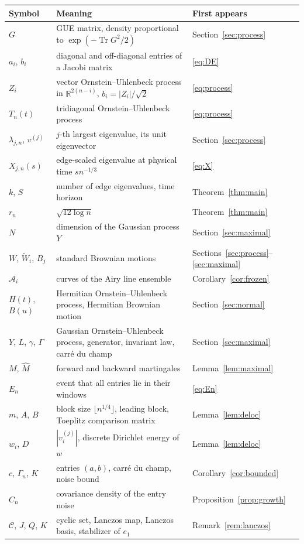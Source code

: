 \documentclass[11pt]{amsart}
\theoremstyle{remark}
\newcommand{\RR}{\mathbb{R}}
\newcommand{\Tr}{\operatorname{Tr}}
\begin{document}
\begin{center}
\begin{tabular}{p{3.0cm}p{8.0cm}p{3.1cm}}
\toprule
Symbol & Meaning & First appears\\
\midrule
$G$ & GUE matrix, density proportional to $\exp(-\Tr G^2/2)$ & Section~\ref{sec:process}\\
$a_i$, $b_i$ & diagonal and off-diagonal entries of a Jacobi matrix & \eqref{eq:DE}\\
$Z_i$ & vector Ornstein--Uhlenbeck process in $\RR^{2(n-i)}$, $b_i=|Z_i|/\sqrt2$ & \eqref{eq:process}\\
$T_n(t)$ & tridiagonal Ornstein--Uhlenbeck process & \eqref{eq:process}\\
$\lambda_{j,n}$, $v^{(j)}$ & $j$-th largest eigenvalue, its unit eigenvector & Section~\ref{sec:process}\\
$X_{j,n}(s)$ & edge-scaled eigenvalue at physical time $sn^{-1/3}$ & \eqref{eq:X}\\
$k$, $S$ & number of edge eigenvalues, time horizon & Theorem~\ref{thm:main}\\
$r_n$ & $\sqrt{12\log n}$ & Theorem~\ref{thm:main}\\
$N$ & dimension of the Gaussian process $Y$ & Section~\ref{sec:maximal}\\
$W$, $\widetilde W_i$, $B_j$ & standard Brownian motions & Sections~\ref{sec:process}--\ref{sec:maximal}\\
$\mathcal A_i$ & curves of the Airy line ensemble & Corollary~\ref{cor:frozen}\\
$H(t)$, $B(u)$ & Hermitian Ornstein--Uhlenbeck process, Hermitian Brownian motion & Section~\ref{sec:normal}\\
$Y$, $L$, $\gamma$, $\Gamma$ & Gaussian Ornstein--Uhlenbeck process, generator, invariant law, carr\'e du champ &
Section~\ref{sec:maximal}\\
$M$, $\widehat M$ & forward and backward martingales & Lemma~\ref{lem:maximal}\\
$E_n$ & event that all entries lie in their windows & \eqref{eq:En}\\
$m$, $A$, $B$ & block size $\lfloor n^{1/4}\rfloor$, leading block, Toeplitz comparison matrix & Lemma~\ref{lem:deloc}\\
$w_i$, $D$ & $|v^{(j)}_i|$, discrete Dirichlet energy of $w$ & Lemma~\ref{lem:deloc}\\
$c$, $\Gamma_n$, $K$ & entries $(a,b)$, carr\'e du champ, noise bound & Corollary~\ref{cor:bounded}\\
$C_n$ & covariance density of the entry noise & Proposition~\ref{prop:growth}\\
$\mathcal C$, $J$, $Q$, $K$ & cyclic set, Lanczos map, Lanczos basis, stabilizer of $e_1$ & Remark~\ref{rem:lanczos}\\
\bottomrule
\end{tabular}
\end{center}
\end{document}
